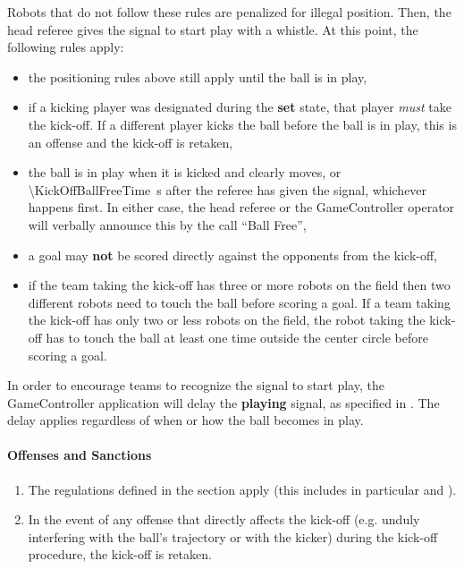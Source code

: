Robots that do not follow these rules are penalized for illegal position. Then, the head referee gives the signal to start play with a whistle. At this point, the following rules apply:
\begin{itemize}
    \item the positioning rules above still apply until the ball is in play,
    
    \item if a kicking player was designated during the \textbf{set} state, that player \textit{must} take the kick-off. If a different player kicks the ball before the ball is in play, this is an offense and the kick-off is retaken,

    \item the ball is in play when it is kicked and clearly moves, or \qty{\KickOffBallFreeTime}{\second} after the referee has given the signal, whichever happens first. In either case, the head referee or the GameController operator will verbally announce this by the call ``Ball Free'',

    \item a goal may \textbf{not} be scored directly against the opponents from the kick-off,

    \item if the team taking the kick-off has three or more robots on the field then two different robots need to touch the ball before scoring a goal. If a team taking the kick-off has only two or less robots on the field, the robot taking the kick-off has to touch the ball at least one time outside the center circle before scoring a goal. 
\end{itemize}

In order to encourage teams to recognize the signal to start play, the GameController application will delay the \textbf{playing} signal, as specified in . The delay applies regardless of when or how the ball becomes in play.

\paragraph{Offenses and Sanctions}

\begin{enumerate}
    \item The regulations defined in the section  apply (this includes in particular  and ).
    \item In the event of any offense that directly affects the kick-off (e.g. unduly interfering with the ball's trajectory or with the kicker) during the kick-off procedure, the kick-off is retaken.
\end{enumerate}



